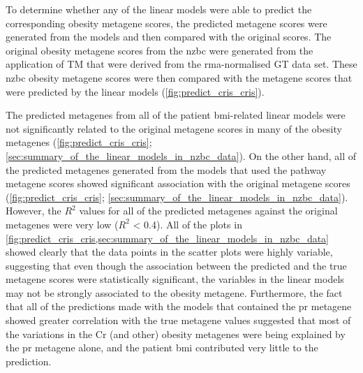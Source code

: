 To determine whether any of the linear models were able to predict the corresponding obesity metagene scores, the predicted metagene scores were generated from the models and then compared with the original scores.
The original obesity metagene scores from the \gls{nzbc} were generated from the application of TM that were derived from the \gls{rma}-normalised GT data set.
These \gls{nzbc} obesity metagene scores were then compared with the metagene scores that were predicted by the linear models (\cref{fig:predict_cris_cris}).

The predicted metagenes from all of the patient \gls{bmi}-related linear models were not significantly related to the original metagene scores in many of the obesity metagenes (\cref{fig:predict_cris_cris}; \cref{sec:summary_of_the_linear_models_in_nzbc_data}).
On the other hand, all of the predicted metagenes generated from the models that used the pathway metagene scores showed significant association with the original metagene scores (\cref{fig:predict_cris_cris}; \cref{sec:summary_of_the_linear_models_in_nzbc_data}).
However, the $R^2$ values for all of the predicted metagenes against the original metagenes were very low ($R^2$ \textless{} 0.4).
All of the plots in \cref{fig:predict_cris_cris,sec:summary_of_the_linear_models_in_nzbc_data} showed clearly that the data points in the scatter plots were highly variable, suggesting that even though the association between the predicted and the true metagene scores were statistically significant, the variables in the linear models may not be strongly associated to the obesity metagene.
Furthermore, the fact that all of the predictions made with the models that contained the \gls{pr} metagene showed greater correlation with the true metagene values suggested that most of the variations in the Cr (and other) obesity metagenes were being explained by the \gls{pr} metagene alone, and the patient \gls{bmi} contributed very little to the prediction.

